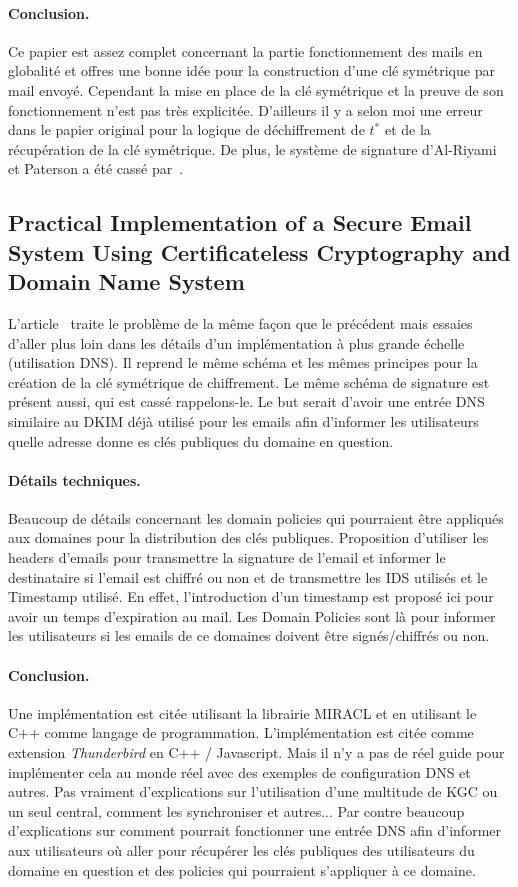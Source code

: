 \paragraph*{Conclusion.} Ce papier est assez complet concernant la partie fonctionnement des mails en globalité et offres une bonne idée pour la construction d'une clé symétrique par mail envoyé. Cependant la mise en place de la clé symétrique et la preuve de son fonctionnement n'est pas très explicitée. D'ailleurs il y a selon moi une erreur dans le papier original pour la logique de déchiffrement de $t^*$ et de la récupération de la clé symétrique. De plus, le système de signature d'Al-Riyami et Paterson a été cassé par~\cite{DBLP:conf/cans/HuangSMZ05}.

\subsection{Practical Implementation of a Secure Email System Using Certificateless Cryptography and Domain Name System}
L'article~\cite{DBLP:journals/ijnsec/BalakrishnanR16} traite le problème de la même façon que le précédent mais essaies d'aller plus loin dans les détails d'un implémentation à plus grande échelle (utilisation DNS). Il reprend le même schéma et les mêmes principes pour la création de la clé symétrique de chiffrement. Le même schéma de signature est présent aussi, qui est cassé rappelons-le. Le but serait d'avoir une entrée DNS similaire au DKIM déjà utilisé pour les emails afin d'informer les utilisateurs quelle adresse donne es clés publiques du domaine en question.

\paragraph*{Détails techniques.} Beaucoup de détails concernant les domain policies qui pourraient être appliqués aux domaines pour la distribution des clés publiques. Proposition d'utiliser les headers d'emails pour transmettre la signature de l'email et informer le destinataire si l'email est chiffré ou non et de transmettre les IDS utilisés et le Timestamp utilisé. En effet, l'introduction d'un timestamp est proposé ici pour avoir un temps d'expiration au mail. Les Domain Policies sont là pour informer les utilisateurs si les emails de ce domaines doivent être signés/chiffrés ou non.

\paragraph*{Conclusion.} Une implémentation est citée utilisant la librairie MIRACL et en utilisant le C++ comme langage de programmation. L'implémentation est citée comme extension \textit{Thunderbird} en C++ / Javascript. Mais il n'y a pas de réel guide pour implémenter cela au monde réel avec des exemples de configuration DNS et autres. Pas vraiment d'explications sur l'utilisation d'une multitude de KGC ou un seul central, comment les synchroniser et autres... Par contre beaucoup d'explications sur comment pourrait fonctionner une entrée DNS afin d'informer aux utilisateurs où aller pour récupérer les clés publiques des utilisateurs du domaine en question et des policies qui pourraient s'appliquer à ce domaine.


